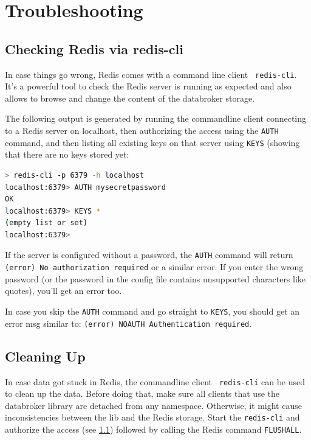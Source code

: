\section{Troubleshooting}
\label{sec:interface:troubleshoot}
\subsection{Checking Redis via redis-cli}
\label{sec:interface:troubleshoot:checkredis}
In case things go wrong, Redis comes with a command line client {\tt
  redis-cli}. It's a powerful tool to check the Redis server is
running as expected and also allows to browse and change the content
of the databroker storage.

The following output is generated by running the commandline client
connecting to a Redis server on localhost, then authorizing the access
using the {\tt AUTH} command, and then listing all existing keys on
that server using {\tt KEYS} (showing that there are no keys stored yet:
\begin{lstlisting}[style=mystyle,language=bash,basicstyle=\scriptsize\ttfamily,caption=Redis
  check via command line tool, label=code:rediscli]
> redis-cli -p 6379 -h localhost
localhost:6379> AUTH mysecretpassword
OK
localhost:6379> KEYS *
(empty list or set)
localhost:6379>
\end{lstlisting}

If the server is configured without a password, the {\tt AUTH} command
will return {\tt (error) No authorization required} or a similar
error.
If you enter the wrong password (or the password in the config file
contains unsupported characters like quotes), you'll get an error too.

In case you skip the {\tt AUTH} command and go straight to {\tt KEYS},
you should get an error msg similar to: {\tt (error) NOAUTH
  Authentication required}.

\subsection{Cleaning Up}
In case data got stuck in Redis, the commandline client {\tt
  redis-cli} can be used to clean up the data. Before doing that, make
sure all clients that use the databroker library are detached from any
namespace. Otherwise, it might cause inconsistencies between the lib
and the Redis storage.
Start the {\tt redis-cli} and authorize the access (see
\ref{sec:interface:troubleshoot:checkredis}) followed by calling the
Redis command {\tt FLUSHALL}.

